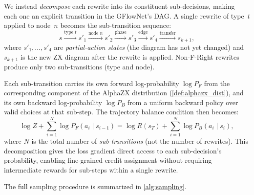 \documentclass[11pt,a4paper]{article}
\begin{document}
We instead \emph{decompose} each rewrite into its constituent
sub-decisions, making each one an explicit transition in the GFlowNet's
DAG.  A single rewrite of type~$t$ applied to node~$n$ becomes the
sub-transition sequence:
\begin{equation}\label{eq:subactions}
s \xrightarrow{\text{type } t} s'_1
  \xrightarrow{\text{node } n} s'_2
  \xrightarrow{\text{phase}} s'_3
  \xrightarrow{\text{edge}} s'_4
  \xrightarrow{\text{transfer}} s_{k+1},
\end{equation}
where $s'_1, \ldots, s'_4$ are \emph{partial-action states} (the diagram
has not yet changed) and $s_{k+1}$ is the new ZX diagram after the
rewrite is applied.  Non-F-Right rewrites produce only two
sub-transitions (type and node).

Each sub-transition carries its own forward log-probability $\log P_F$
from the corresponding component of the AlphaZX distribution
(\cref{def:alphazx_dist}), and its own backward log-probability
$\log P_B$ from a uniform backward policy over valid choices at that
sub-step.  The trajectory balance condition then becomes:
\begin{equation}\label{eq:tb}
\log Z + \sum_{i=1}^{N} \log P_F(a_i \mid s_{i-1})
= \log R(s_T) + \sum_{i=1}^{N} \log P_B(a_i \mid s_i),
\end{equation}
where $N$ is the total number of \emph{sub-transitions} (not the number
of rewrites).  This decomposition gives the loss gradient direct access
to each sub-decision's probability, enabling fine-grained credit
assignment without requiring intermediate rewards for sub-steps within a
single rewrite.

The full sampling procedure is summarized in \cref{alg:sampling}.
\end{document}
